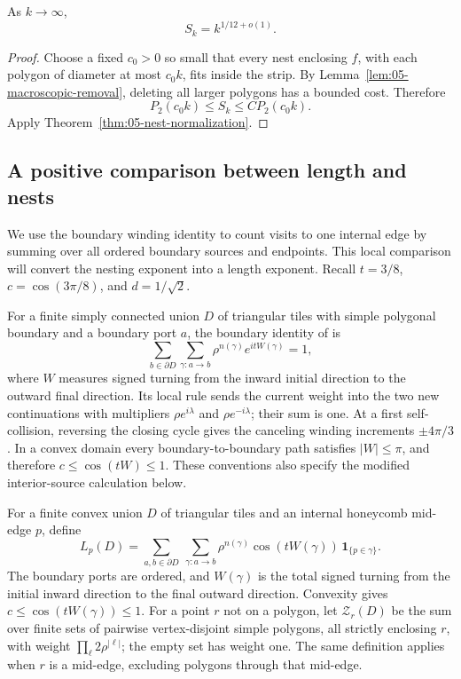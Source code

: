 \begin{corollary}\label{E:strip-nesting}
As \(k\longrightarrow\infty\),
\begin{equation}
 S_k=k^{1/12+o(1)}.
 \label{eq:C-nest}
\end{equation}
\end{corollary}
\begin{proof}
Choose a fixed \(c_0>0\) so small that every nest enclosing \(f\),
with each polygon of diameter at most \(c_0k\), fits inside the strip. By
Lemma~\ref{lem:05-macroscopic-removal}, deleting all larger polygons
has a bounded cost. Therefore
\[
 P_2(c_0k)\le S_k\le C P_2(c_0k).
\]
Apply Theorem~\ref{thm:05-nest-normalization}.
\end{proof}

\subsection{A positive comparison between length and nests}

We use the boundary winding identity to count visits to one internal
edge by summing over all ordered boundary sources and endpoints. This
local comparison will convert the nesting exponent into a length
exponent. Recall \(t=3/8\), \(c=\cos(3\pi/8)\), and \(d=1/\sqrt2\).

For a finite simply connected union $D$ of triangular tiles with simple
polygonal boundary and a boundary port $a$, the boundary identity of \cite[Lemma~2.1]{StripCompanion} is
\begin{equation}\label{eq:E-boundary-input}
 \sum_{b\in\partial D}\sum_{\gamma:a\to b}
       \rho^{n(\gamma)}e^{itW(\gamma)}=1,
\end{equation}
where $W$ measures signed turning from the inward initial direction to
the outward final direction. Its local rule sends the current weight
into the two new continuations with multipliers
$\rho e^{i\lambda}$ and $\rho e^{-i\lambda}$; their sum is one.
At a first self-collision, reversing the closing cycle gives the
canceling winding increments $\pm4\pi/3$. In a convex domain every
boundary-to-boundary path satisfies $|W|\le\pi$, and therefore
$c\le\cos(tW)\le1$. These conventions also specify the modified
interior-source calculation below.


For a finite convex union $D$ of triangular tiles and an internal
honeycomb mid-edge $p$, define
\[
 L_p(D)=\sum_{a,b\in\partial D}\ \sum_{\gamma:a\to b}
 \rho^{n(\gamma)}\cos(tW(\gamma))\,
 \mathbf1_{\{p\in\gamma\}}.
\]
The boundary ports are ordered, and $W(\gamma)$ is the total signed
turning from the initial inward direction to the final outward direction.
Convexity gives $c\le\cos(tW(\gamma))\le1$.
For a point $r$ not on a polygon, let $\mathcal Z_r(D)$ be the sum over
finite sets of pairwise vertex-disjoint simple polygons, all strictly
enclosing $r$, with weight $\prod_\ell 2\rho^{|\ell|}$; the empty set
has weight one. The same definition applies when $r$ is a mid-edge,
excluding polygons through that mid-edge.

